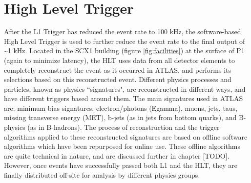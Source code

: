 \section{High Level Trigger}
    After the L1 Trigger has reduced the event rate to 100 kHz, the software-based High Level Trigger is used to further reduce the event rate to the final output of \textasciitilde 1 kHz.
    Located in the SCX1 building (figure \ref{fig:facilities}) at the surface of P1 (again to minimize latency), the HLT uses data from all detector elements to completely reconstruct the event as it occurred in ATLAS, and performs its selections based on this reconstructed event.
    Different physics processes and particles, known as physics ``signatures", are reconstructed in different ways, and have different triggers based around them. 
    The main signatures used in ATLAS are: minimum bias signatures, electron/photons (Egamma), muons, jets, taus, missing transverse energy (MET), b-jets (as in jets from bottom quarks), and B-physics (as in B-hadrons).
    The process of reconstruction and the trigger algorithms applied to these reconstructed signatures are based on offline software algorithms which have been repurposed for online use.
    These offline algorithms are quite technical in nature, and are discussed further in chapter [TODO].
    However, once events have successfully passed both L1 and the HLT, they are finally distributed off-site for analysis by different physics groups.
    
    

